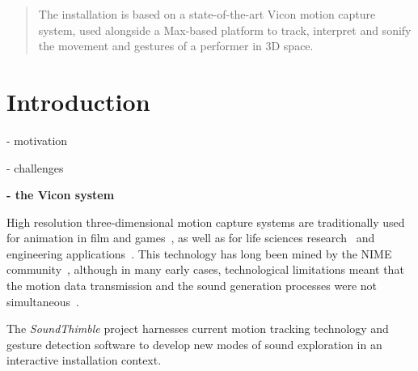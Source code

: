 \documentclass{nime-alternate}
\begin{document}
\maketitle
\begin{abstract}
	
	


 The installation is based on a state-of-the-art Vicon motion capture system, used alongside a Max-based platform to track, interpret and sonify the movement and gestures of a performer in 3D space.
\end{abstract}






\section{Introduction}

- motivation

- challenges

\textbf{- the Vicon system}\\ \par



High resolution three-dimensional motion capture systems are traditionally used for animation in film and games~\cite{animatie}, as well as for life sciences research~\cite{life} and engineering applications~\cite{eng}. This technology has long been mined by the NIME community~\cite{dobrian2003gestural, nymoen2011soundsaber}, although in many early cases, technological limitations meant that the motion data transmission and the sound generation processes were not simultaneous~\cite{dobrian2003gestural, kapur2005framework}.



The \textit{SoundThimble} project harnesses current motion tracking technology and gesture detection software to develop new modes of sound exploration in an interactive installation context.
\end{document}
